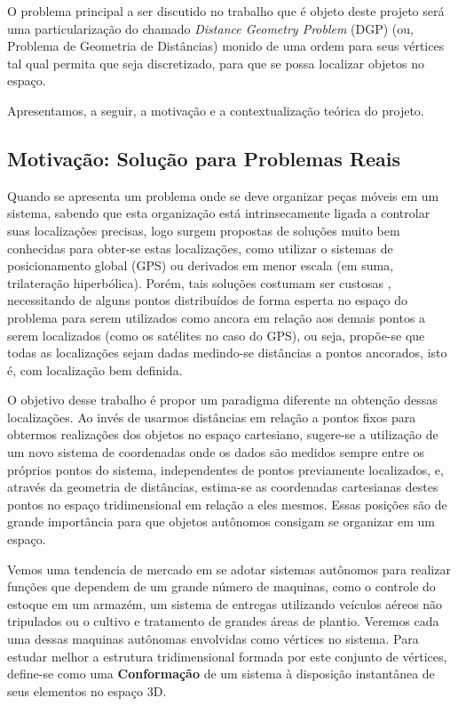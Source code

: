 \documentclass[11pt]{article}
\begin{document}
O problema principal a ser discutido no trabalho que é objeto deste projeto será uma particularização do chamado {\emph{Distance Geometry Problem}} (DGP) (ou, Problema de Geometria de Distâncias) monido de uma ordem para seus vértices tal qual permita que seja discretizado, para que se possa localizar objetos no espaço.

Apresentamos, a seguir, a motivação e a contextualização teórica do projeto.


\subsection{Motivação: Solução para Problemas Reais}	
Quando se apresenta um problema onde se deve organizar peças móveis em um sistema, sabendo que esta organização está intrinsecamente ligada a controlar suas localizações precisas, logo surgem propostas de soluções muito bem conhecidas para obter-se estas localizações, como utilizar o sistemas de posicionamento global (GPS) ou derivados em menor escala (em suma, trilateração hiperbólica). Porém, tais soluções costumam ser custosas \cite{savvides2001dynamic}, necessitando de alguns pontos distribuídos de forma esperta no espaço do problema para serem utilizados como ancora em relação aos demais pontos a serem localizados (como os satélites no caso do GPS), ou seja, propõe-se que todas as localizações sejam dadas medindo-se distâncias a pontos ancorados, isto é, com localização bem definida.

O objetivo desse trabalho é propor um paradigma diferente na obtenção dessas localizações. Ao invés de usarmos distâncias em relação a pontos fixos para obtermos realizações dos objetos no espaço cartesiano, sugere-se a utilização de um novo sistema de coordenadas onde os dados são medidos sempre entre os próprios pontos do sistema, independentes de pontos previamente localizados, e, através da geometria de distâncias, estima-se as coordenadas cartesianas destes pontos no espaço tridimensional em relação a eles mesmos. Essas posições são de grande importância para que objetos autônomos consigam se organizar em um espaço.

Vemos uma tendencia de mercado em se adotar sistemas autônomos para realizar funções que dependem de um grande número de maquinas, como o controle do estoque em um armazém, um sistema de entregas utilizando veículos aéreos não tripulados ou o cultivo e tratamento de grandes áreas de plantio. Veremos cada uma dessas maquinas autônomas envolvidas como vértices no sistema. Para estudar melhor a estrutura tridimensional formada por este conjunto de vértices, define-se como uma \textbf{Conformação} de um sistema à disposição instantânea de seus elementos no espaço 3D.
\end{document}
